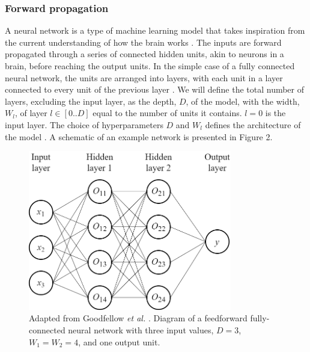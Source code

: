 \documentclass[12pt]{article}
\begin{document}
\subsubsection{Forward propagation}
A neural network is a type of machine learning model that takes inspiration from the current understanding of how the brain works \cite{Minsky69}. The inputs are forward propagated through a series of connected hidden units, akin to neurons in a brain, before reaching the output units. In the simple case of a fully connected neural network, the units are arranged into layers, with each unit in a layer connected to every unit of the previous layer \cite{Rumelhart86}. We will define the total number of layers, excluding the input layer, as the depth, $D$, of the model, with the width, $W_l$, of layer $l\in[0..D]$ equal to the number of units it contains. $l=0$ is the input layer. The choice of hyperparameters $D$ and $W_l$ defines the architecture of the model \cite{Haykin98}. A schematic of an example network is presented in Figure 2. 

\begin{figure}[!htb]
\centering
\includegraphics[width=3.5in]{images/feedforward_nn.png}
\caption{Adapted from Goodfellow \textit{et al.} \cite{Goodfellow16}. Diagram of a feedforward fully-connected neural network with three input values, $D=3$, $W_1=W_2=4$, and one output unit.}
\end{figure}
\end{document}
